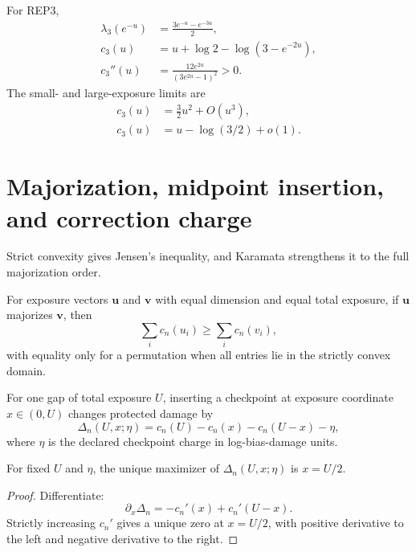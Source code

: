 \documentclass[aps,prx,preprint,superscriptaddress,nofootinbib,longbibliography]{revtex4-2}
\begin{document}
For REP3,
\begin{align}
\lambda_3(e^{-u})&=\frac{3e^{-u}-e^{-3u}}{2},\\
c_3(u)&=u+\log2-\log(3-e^{-2u}),\\
c_3''(u)&=\frac{12e^{2u}}{(3e^{2u}-1)^2}>0.
\end{align}
The small- and large-exposure limits are
\begin{align}
c_3(u)&=\frac32u^2+O(u^3),\\
c_3(u)&=u-\log(3/2)+o(1).
\end{align}

\section{Majorization, midpoint insertion, and correction charge}
Strict convexity gives Jensen's inequality, and Karamata strengthens it to the full majorization order.

\begin{corollary}
For exposure vectors $\bm u$ and $\bm v$ with equal dimension and equal total exposure, if $\bm u$ majorizes $\bm v$, then
\begin{equation}
\sum_i c_n(u_i)\ge\sum_i c_n(v_i),
\end{equation}
with equality only for a permutation when all entries lie in the strictly convex domain.
\end{corollary}

For one gap of total exposure $U$, inserting a checkpoint at exposure coordinate $x\in(0,U)$ changes protected damage by
\begin{equation}
\Delta_n(U,x;\eta)=c_n(U)-c_n(x)-c_n(U-x)-\eta,
\end{equation}
where $\eta$ is the declared checkpoint charge in log-bias-damage units.

\begin{proposition}
For fixed $U$ and $\eta$, the unique maximizer of $\Delta_n(U,x;\eta)$ is $x=U/2$.
\end{proposition}
\begin{proof}
Differentiate:
\begin{equation}
\partial_x\Delta_n=-c_n'(x)+c_n'(U-x).
\end{equation}
Strictly increasing $c_n'$ gives a unique zero at $x=U/2$, with positive derivative to the left and negative derivative to the right.
\end{proof}
\end{document}
